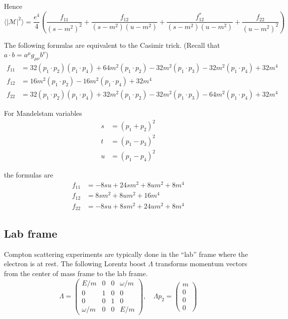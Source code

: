 \documentclass[12pt]{article}
\begin{document}
Hence
\begin{equation*}
\langle|\mathcal{M}|^2\rangle
=
\frac{e^4}{4}
\left(
\frac{f_{11}}{(s-m^2)^2}
+\frac{f_{12}}{(s-m^2)(u-m^2)}
+\frac{f_{12}^*}{(s-m^2)(u-m^2)}
+\frac{f_{22}}{(u-m^2)^2}
\right)
\tag{1}
\end{equation*}

The following formulas are equivalent to the Casimir trick.
(Recall that $a\cdot b=a^\mu g_{\mu\nu}b^\nu$)
\begin{align*}
f_{11}&=
 32 (p_1 \cdot p_2) (p_1 \cdot p_4) +
 64 m^2 (p_1 \cdot p_2) -
 32 m^2 (p_1 \cdot p_3) -
 32 m^2 (p_1 \cdot p_4) + 32 m^4
\\
f_{12}&=16 m^2 (p_1 \cdot p_2) - 16 m^2 (p_1 \cdot p_4) + 32m^4
\\
f_{22}&=
32 (p_1 \cdot p_2) (p_1 \cdot p_4) +
32 m^2 (p_1 \cdot p_2) -
32 m^2 (p_1 \cdot p_3) -
64 m^2 (p_1 \cdot p_4) + 32 m^4
\end{align*}

For Mandelstam variables
\begin{align*}
s&=(p_1+p_2)^2
\\
t&=(p_1-p_3)^2
\\
u&=(p_1-p_4)^2
\end{align*}

the formulas are
\begin{equation*}
\begin{aligned}
f_{11}&=-8 s u + 24 s m^2 + 8 u m^2 + 8 m^4
\\
f_{12}&=8 s m^2 + 8 u m^2 + 16 m^4
\\
f_{22}&=-8 s u + 8 s m^2 + 24 u m^2 + 8 m^4
\end{aligned}
\tag{2}
\end{equation*}

\subsection*{Lab frame}
Compton scattering experiments are typically done in the ``lab'' frame where the electron is at rest.
The following Lorentz boost $\Lambda$ transforms momentum vectors from
the center of mass frame to the lab frame.
\begin{equation*}
\Lambda=
\begin{pmatrix}
E/m & 0 & 0 & \omega/m\\
0 & 1 & 0 & 0\\
0 & 0 & 1 & 0\\
\omega/m & 0 & 0 & E/m
\end{pmatrix},
\quad
\Lambda p_2=\begin{pmatrix}m \\ 0 \\ 0 \\ 0\end{pmatrix}
\end{equation*}
\end{document}
